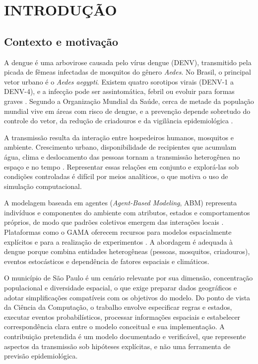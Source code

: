 \chapter{INTRODUÇÃO}
\label{cap:introducao}

\section{Contexto e motivação}

A dengue é uma arbovirose causada pelo vírus dengue (DENV), transmitido pela picada de fêmeas infectadas de mosquitos do gênero \textit{Aedes}. No Brasil, o principal vetor urbano é o \textit{Aedes aegypti}. Existem quatro sorotipos virais (DENV-1 a DENV-4), e a infecção pode ser assintomática, febril ou evoluir para formas graves \cite{MinisterioSaude2025, WHO2023}. Segundo a Organização Mundial da Saúde, cerca de metade da população mundial vive em áreas com risco de dengue, e a prevenção depende sobretudo do controle do vetor, da redução de criadouros e da vigilância epidemiológica \cite{WHO2023}.

A transmissão resulta da interação entre hospedeiros humanos, mosquitos e ambiente. Crescimento urbano, disponibilidade de recipientes que acumulam água, clima e deslocamento das pessoas tornam a transmissão heterogênea no espaço e no tempo \cite{WHO2023}. Representar essas relações em conjunto e explorá-las sob condições controladas é difícil por meios analíticos, o que motiva o uso de simulação computacional.

A modelagem baseada em agentes (\textit{Agent-Based Modeling}, ABM) representa indivíduos e componentes do ambiente com atributos, estados e comportamentos próprios, de modo que padrões coletivos emergem das interações locais \cite{Macal2010}. Plataformas como o GAMA oferecem recursos para modelos espacialmente explícitos e para a realização de experimentos \cite{Taillandier2019}. A abordagem é adequada à dengue porque combina entidades heterogêneas (pessoas, mosquitos, criadouros), eventos estocásticos e dependência de fatores espaciais e climáticos.

O município de São Paulo é um cenário relevante por sua dimensão, concentração populacional e diversidade espacial, o que exige preparar dados geográficos e adotar simplificações compatíveis com os objetivos do modelo. Do ponto de vista da Ciência da Computação, o trabalho envolve especificar regras e estados, executar eventos probabilísticos, processar informações espaciais e estabelecer correspondência clara entre o modelo conceitual e sua implementação. A contribuição pretendida é um modelo documentado e verificável, que represente aspectos da transmissão sob hipóteses explícitas, e não uma ferramenta de previsão epidemiológica.


